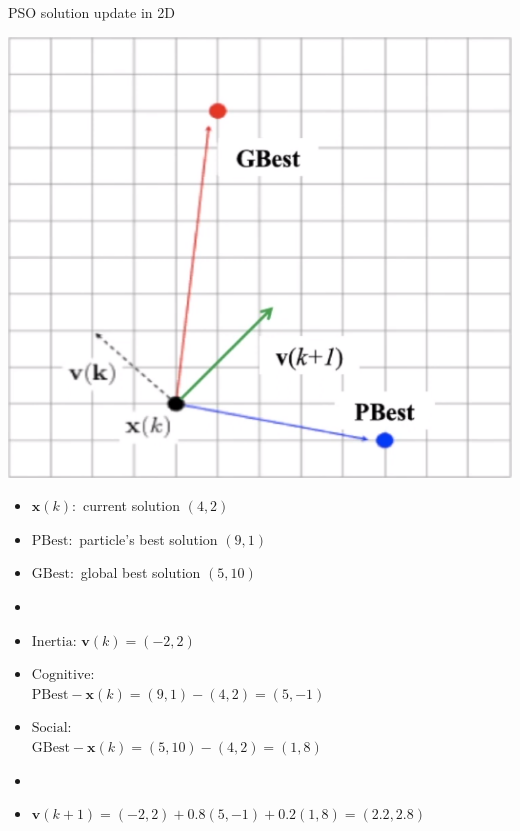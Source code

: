 \documentclass[pdflatex,compress,mathserif]{beamer}
\begin{document}
\begin{frame}{PSO solution update in 2D}
	\begin{multicols}{2}
		\includegraphics[width=\linewidth]{img/13}
		\vfill\null
		\columnbreak
		\begin{itemize}
			\item[] \scriptsize{$\mathbf{x}(k):$ current solution $(4,2)$}
			\item[] \scriptsize{$\text{PBest}:$ particle's best solution $(9,1)$}
			\item[] \scriptsize{$\text{GBest}:$ global best solution $(5,10)$}
			\item[]
			\item[] \scriptsize{$\text{Inertia}$: $\mathbf{v}(k) = (-2,2)$}
			\item[] \scriptsize{$\text{Cognitive}$:\\
				$\text{PBest} - \mathbf{x}(k) = (9,1) - (4,2) = (5,-1)$}
			\item[] \scriptsize{$\text{Social}$:\\
				$\text{GBest} - \mathbf{x}(k) = (5,10) - (4,2) = (1,8)$}
			\item[]
			\item[] $\mathbf{v}(k+1) = (-2,2) + 0.8(5,-1) + 0.2(1,8) = (2.2,2.8)$
		\end{itemize}
		\vfill\null
	\end{multicols}
\end{frame}
\end{document}
